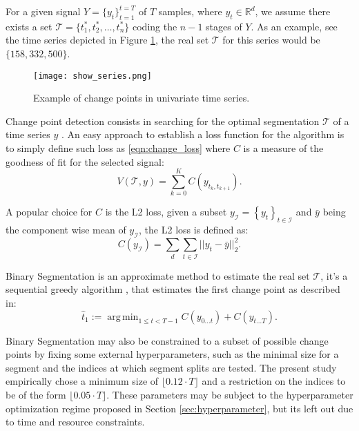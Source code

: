 \documentclass{IEEEtran}
\DeclareMathOperator*{\argmin}{arg\,min}
\begin{document}
                For a given signal $Y = \{y_t\}_{t=1}^{t=T}$ of $T$ samples, where $y_t \in \mathbb{R}^d$, we assume there exists a set $\mathcal{T} = \{t_{1}^{*}, t_{2}^{*}, \dots, t_{n}^{*}\}$ coding the $n-1$ stages of $Y$. As an example, see the time series depicted in Figure \ref{fig:changepoint_example}, the real set $\mathcal{T}$ for this series would be $\{158, 332, 500\}$.
                \begin{figure}[!htbp]
                    \centering
                    \texttt{[image: show\_series.png]}
                    \caption{Example of change points in univariate time series.}
                    \label{fig:changepoint_example}
                \end{figure}

                Change point detection consists in searching for the optimal segmentation $\mathcal{T}$ of a time series $y$ \cite{truong2020selective}. An easy approach to establish a loss function for the algorithm is to simply define such loss as \eqref{eqn:change_loss} where $C$ is a measure of the goodness of fit for the selected signal:
                \begin{equation}\label{eqn:change_loss}
                    V(\mathcal{T}, y) = \sum_{k=0}^{K} C(y_{t_k, t_{k+1}}).
                \end{equation}

                A popular choice for $C$ is the L2 loss, given a subset $y_\mathcal{I} = \left\{y_t\right\}_{t \in \mathcal{I}}$ and $\bar{y}$ being the component wise mean of $y_{\mathcal{I}}$, the L2 loss is defined as:
                \begin{equation}\label{eqn:l2_segment_loss}
                    C(y_{\mathcal{I}}) = \sum_{d} \sum_{t \in \mathcal{I}} ||y_t - \bar{y} ||_{2}^{2}.
                \end{equation}

                Binary Segmentation is an approximate method to estimate the real set $\mathcal{T}$, it's a sequential greedy algorithm \cite{truong2020selective}, \cite{jiang2023time} that estimates the first change point as described in:
                \begin{equation} \label{eqn:binseg}
                    \hat{t}_{1} := \argmin_{1 \leq t < T - 1} C(y_{0 \dots t}) + C(y_{t \dots T}).
                \end{equation}

                Binary Segmentation may also be constrained to a subset of possible change points by fixing some external hyperparameters, such as the minimal size for a segment and the indices at which segment splits are tested. The present study empirically chose a minimum size of $\lfloor 0.12 \cdot T\rfloor$ and a restriction on the indices to be of the form $\lfloor 0.05 \cdot T \rfloor$. These parameters may be subject to the hyperparameter optimization regime proposed in Section \ref{sec:hyperparameter}, but its left out due to time and resource constraints.
\end{document}
